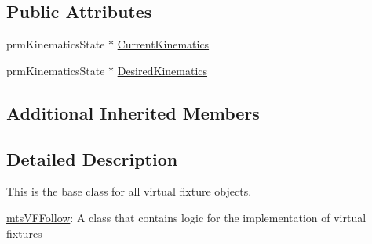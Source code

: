 \subsection*{Public Attributes}
\begin{DoxyCompactItemize}
\item 
prm\-Kinematics\-State $\ast$ \hyperlink{classmts_v_f_follow_jacobian_aa671c9c1e5c7e8945535b49ffe479765}{Current\-Kinematics}
\item 
prm\-Kinematics\-State $\ast$ \hyperlink{classmts_v_f_follow_jacobian_a5b06bdfc990f1affa05a8178a1623068}{Desired\-Kinematics}
\end{DoxyCompactItemize}
\subsection*{Additional Inherited Members}


\subsection{Detailed Description}
This is the base class for all virtual fixture objects. 

\hyperlink{classmts_v_f_follow}{mts\-V\-F\-Follow}\-: A class that contains logic for the implementation of virtual fixtures 

